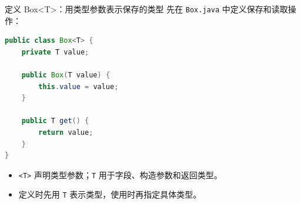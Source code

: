 \documentclass[aspectratio=169]{beamer}
\begin{document}

\begin{frame}[fragile]{定义 Box<T>：用类型参数表示保存的类型}
  先在 \texttt{Box.java} 中定义保存和读取操作：
  \begin{lstlisting}[language=Java]
public class Box<T> {
    private T value;

    public Box(T value) {
        this.value = value;
    }

    public T get() {
        return value;
    }
}
  \end{lstlisting}
  \begin{itemize}
    \item \texttt{<T>} 声明类型参数；\texttt{T} 用于字段、构造参数和返回类型。
    \item 定义时先用 \texttt{T} 表示类型，使用时再指定具体类型。
  \end{itemize}
\end{frame}
\end{document}

